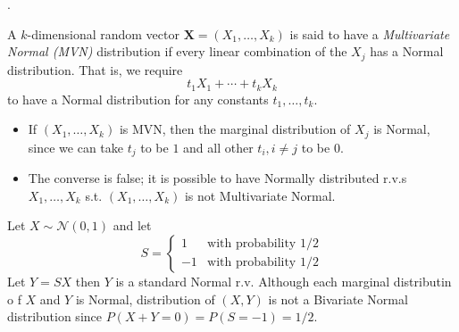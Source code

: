 \documentclass[8pt]{beamer}
\newcommand{\mb}[1]{\mathbf{#1}}
\newcommand{\mc}[1]{\mathcal{#1}}
\newcommand{\ti}[1]{\textit{#1}}
\begin{document}
\begin{frame}{.}
    \begin{definition}
        A $k$-dimensional random vector $\mb{X}=(X_1, \dots, X_k)$ is said to have a \ti{Multivariate Normal (MVN)} distribution if every linear combination of the $X_j$ has a Normal distribution. That is, we require
        \[
            t_1 X_1 + \cdots + t_k X_k
        \]
        to have a Normal distribution for any constants $t_1, \dots, t_k$.
    \end{definition}

    \begin{itemize}
        \item If $(X_1, \dots, X_k)$ is MVN, then the marginal distribution of $X_j$ is Normal, since we can take $t_j$ to be $1$ and all other $t_i, i \neq j$ to be $0$.
        \item The converse is false; it is possible to have Normally distributed r.v.s $X_1, \dots, X_k$ s.t. $(X_1, \dots, X_k)$ is not Multivariate Normal.
    \end{itemize}

    \begin{example}
        Let $X \sim \mc{N}(0,1)$ and let
        \[
            S = \begin{cases}
                1 & \text{with probability } 1/2 \\
                -1 & \text{with probability } 1/2
            \end{cases}
        \]
        Let $Y = SX$ then $Y$ is a standard Normal r.v. Although each marginal distributin o f $X$ and $Y$ is Normal, distribution of $(X,Y)$ is not a Bivariate Normal distribution since $P(X+Y=0) = P(S=-1)= 1/2$.
    \end{example}
\end{frame}
\end{document}
